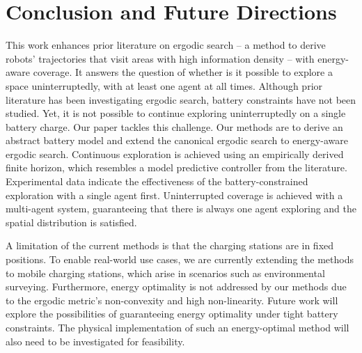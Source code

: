 \documentclass[letterpaper,10pt,conference,twoside]{IEEEtran}
\theoremstyle{definition}
\begin{document}
\section{Conclusion and Future Directions}\label{sec:conc}
\noindent
This work enhances prior literature on ergodic search -- a method to derive robots' trajectories that visit areas with high information density -- with energy-aware coverage. It answers the question of whether is it possible to explore a space uninterruptedly, with at least one agent at all times. Although prior literature has been investigating ergodic search, battery constraints have not been studied. Yet, it is not possible to continue exploring uninterruptedly on a single battery charge. Our paper tackles this challenge. Our methods are to derive an abstract battery model and extend the canonical ergodic search to energy-aware ergodic search. Continuous exploration is achieved using an empirically derived finite horizon, which resembles a model predictive controller from the literature. Experimental data indicate the effectiveness of the battery-constrained exploration with a single agent first. Uninterrupted coverage is achieved with a multi-agent system, guaranteeing that there is always one agent exploring and the spatial distribution is satisfied.

A limitation of the current methods is that the charging stations are in fixed positions. To enable real-world use cases, we are currently extending the methods to mobile charging stations, which arise in scenarios such as environmental surveying. Furthermore, energy optimality is not addressed by our methods due to the ergodic metric's non-convexity and high non-linearity. Future work will explore the possibilities of guaranteeing energy optimality under tight battery constraints. The physical implementation of such an energy-optimal method will also need to be investigated for feasibility.

{\small
 

}
\end{document}
